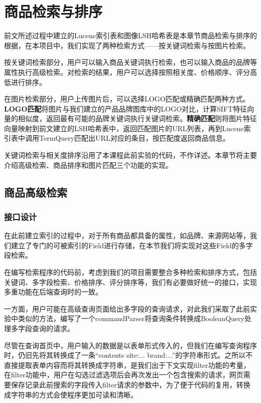 
\chapter{商品检索与排序}

前文所述过程中建立的Lucene索引表和图像LSH哈希表是本章节商品检索与排序的根据，在本项目中，我们实现了两种检索方式——按关键词检索与按图片检索。

按关键词检索部分，用户可以输入商品关键词执行检索，也可以输入商品的品牌等属性执行高级检索。对检索的结果，用户可以选择按照相关度、价格顺序、评分高低进行排序。

在图片检索部分，用户上传图片后，可以选择LOGO匹配或精确匹配两种方式。\textbf{LOGO匹配}将图片与我们建立的产品品牌图库中的LOGO对比，计算SIFT特征向量的相似度，返回最有可能的品牌关键词执行关键词检索。\textbf{精确匹配}则将图片特征向量映射到前文建立的LSH哈希表中，返回匹配图片的URL列表，再到Lucene索引表中调用TermQuery匹配出URL对应的条目，按匹配度返回商品信息。

关键词检索与相关度排序沿用了本课程此前实验的代码，不作详述。本章节将主要介绍高级检索、商品排序和图片匹配三个功能的实现。

\section{商品高级检索}


\subsection{接口设计}

在此前建立索引的过程中，对于所有商品都具备的属性，如品牌、来源网站等，我们建立了专门的可被索引的Field进行存储，在本节我们将实现对这些Field的多字段检索。

在编写检索程序的代码前，考虑到我们的项目需要整合多种检索和排序方式，包括关键词、多字段检索、价格排序、评分排序等，我们有必要做好统一的接口，实现多重功能在后端查询时的一致。

一方面，用户可能在高级查询页面给出多字段的查询请求，对此我们采取了此前实验中类似的方法，编写了一个commandParser将查询条件转换成BooleanQuery处理多字段查询的请求。

尽管在查询首页中，用户输入的数据是以表单形式传入的，但我们在编写查询程序时，仍旧先将其转换成了一条“contents site:... brand:...”的字符串形式。之所以不直接提取表单内容而将其转换成字符串，是我们出于下文实现filter功能的考量，在filter功能中，用户在勾选过滤选项后会再次发出一个包含搜索的请求，网页需要保存记录此前搜索的字段传入filter请求的参数中，为了便于代码的复用，转换成字符串的方式会使程序更加可读和清晰。

